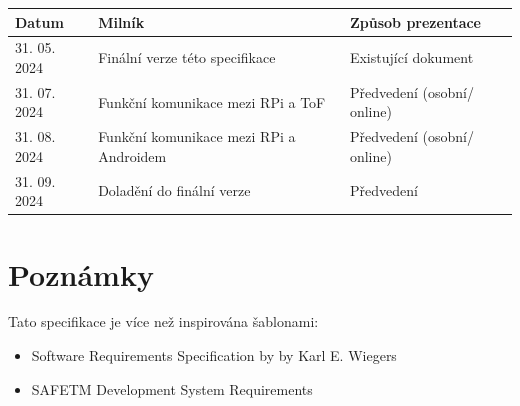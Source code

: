 \documentclass[12pt,a4paper]{article}
\begin{document}
\begin{center}
	\begin{tabular}{|p{2.5cm} | p{8cm} | p{5cm} |} 
		\hline
		\textbf{Datum} & \textbf{Milník} & \textbf{Způsob prezentace} \\ [0.5ex] 
		\hline
		31. 05. 2024 & Finální verze této specifikace & Existující dokument\\  [0.5ex] 
		\hline
		31. 07. 2024 & Funkční komunikace mezi RPi a ToF & Předvedení (osobní/ online) \\ [0.5ex] 
		\hline
		31. 08. 2024 & Funkční komunikace mezi RPi a Androidem & Předvedení (osobní/ online) \\ [0.5ex] 
		\hline
		31. 09. 2024 & Doladění do finální verze & Předvedení \\  [0.5ex] 
		\hline
	\end{tabular}
\end{center}

\section{Poznámky}

Tato specifikace je více než inspirována šablonami:
\begin{itemize}
	\item Software Requirements Specification by by Karl E. Wiegers
	\item SAFETM Development System Requirements
\end{itemize}
\end{document}

